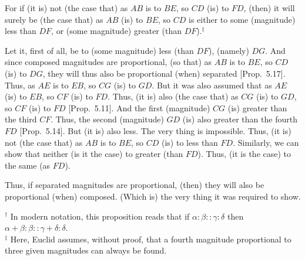 \begin{Parallel}{}{}
{For if (it is) not (the case that) as $AB$ is to $BE$, so $CD$ (is) to $FD$, (then) it will
surely be (the case that) as $AB$ (is) to $BE$, so
 $CD$ is either to some (magnitude) less than $DF$, or (some magnitude) greater (than $DF$).$^\ddag$
 
 Let it, first of all, be to (some magnitude) less (than $DF$), (namely) $DG$. And since composed magnitudes are proportional, (so that) as $AB$ is
 to $BE$, so $CD$ (is) to $DG$,  they will  thus also be proportional (when) separated 
 [Prop.~5.17]. Thus, as $AE$ is to $EB$, so
 $CG$ (is) to $GD$. But it was also assumed that as $AE$ (is) to $EB$, so $CF$ (is)
 to $FD$. Thus, (it is) also (the case that) as $CG$ (is) to $GD$, so $CF$ (is) to $FD$ [Prop.~5.11]. And the first (magnitude) $CG$ (is)
 greater than the third $CF$. Thus, the second (magnitude) $GD$ (is)
 also greater than the fourth $FD$ [Prop.~5.14]. 
 But (it is) also less. The very thing is impossible. Thus, (it is) not (the case that) as $AB$ is to $BE$, so $CD$ (is) to less than $FD$. Similarly, we can show
 that neither (is it the case) to greater (than $FD$). Thus, (it is the case) to
 the same (as $FD$).
 
 Thus, if separated  magnitudes are proportional,  (then) they will also be 
 proportional (when)
composed. (Which is) the very thing it was required to show.}
\end{Parallel}
{\footnotesize \noindent$^\dag$ In modern notation, this proposition
reads that if $\alpha:\beta::\gamma:\delta$ then $\alpha+\beta:\beta::
\gamma+\delta:\delta$.}\\
{\footnotesize \noindent$^\ddag$ Here, Euclid assumes, without proof, that
a fourth magnitude proportional to three given magnitudes can always
be found.}


